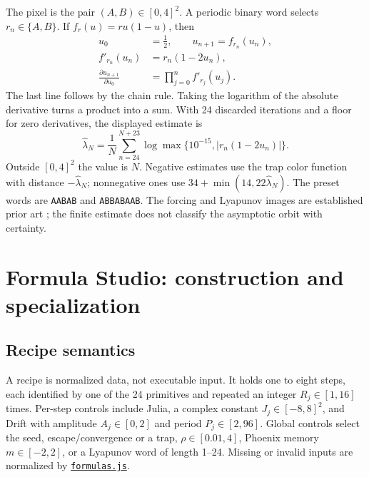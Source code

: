 \documentclass[11pt,a4paper]{article}
\numberwithin{equation}{section}
\newcommand{\abs}[1]{\lvert#1\rvert}
\newcommand{\code}[1]{\texttt{#1}}
\begin{document}
The pixel is the pair \((A,B)\in[0,4]^2\). A periodic binary word
selects \(r_n\in\{A,B\}\). If \(f_r(u)=ru(1-u)\), then
\begin{align}
  u_0&=\tfrac12,\qquad u_{n+1}=f_{r_n}(u_n),\\
  f'_{r_n}(u_n)&=r_n(1-2u_n),\\
  \frac{\partial u_{n+1}}{\partial u_0}
    &=\prod_{j=0}^{n} f'_{r_j}(u_j).
\end{align}
The last line follows by the chain rule. Taking the logarithm of the
absolute derivative turns a product into a sum. With 24 discarded
iterations and a floor for zero derivatives, the displayed estimate is
\begin{equation}
  \widehat\lambda_N=\frac{1}{N}
  \sum_{n=24}^{N+23}\log\max\{10^{-15},\abs{r_n(1-2u_n)}\}.
\end{equation}
Outside \([0,4]^2\) the value is \(N\). Negative estimates use the trap
color function with distance \(-\widehat\lambda_N\); nonnegative ones
use \(34+\min(14,22\widehat\lambda_N)\). The preset words are
\code{AABAB} and \code{ABBABAAB}. The forcing and Lyapunov images are
established prior art \cite{markus}; the finite estimate does not classify
the asymptotic orbit with certainty.

\section{Formula Studio: construction and specialization}\label{sec:studio}

\subsection{Recipe semantics}

A recipe is normalized data, not executable input. It holds one to eight
steps, each identified by one of the 24 primitives and repeated an
integer \(R_j\in[1,16]\) times. Per-step controls include Julia, a complex
constant \(J_j\in[-8,8]^2\), and Drift with amplitude \(A_j\in[0,2]\)
and period \(P_j\in[2,96]\). Global controls select the seed,
escape/convergence or a trap, \(\rho\in[0.01,4]\), Phoenix memory
\(m\in[-2,2]\), or a Lyapunov word of length 1--24. Missing or invalid
inputs are normalized by \href{../dist/formulas.js}{\code{formulas.js}}.
\end{document}
